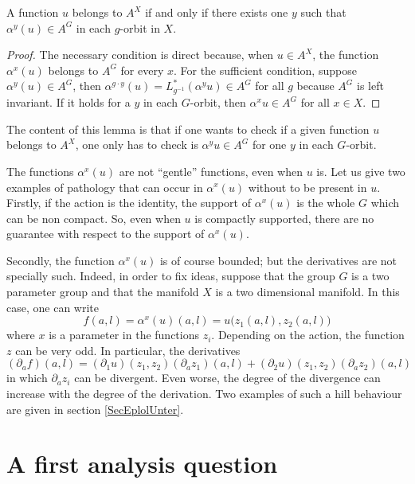 \begin{lemma}   
A function $u$ belongs to $A^{X}$ if and only if there exists one $y$ such that $\alpha^y(u)\in A^G$ in each $g$-orbit in $X$.
        \label{LemUnPtParOrbite}
\end{lemma}

\begin{proof}
The necessary condition is direct because, when $u\in A^X$, the function $\alpha^x(u)$ belongs to $A^G$ for every $x$. For the sufficient condition, suppose $\alpha^y(u)\in A^{G}$, then $\alpha^{g\cdot y}(u)=L_{g^{-1}}^*(\alpha^yu)\in A^{G}$ for all $g$ because $A^{G}$ is left invariant. If it holds for a $y$ in each $G$-orbit, then $\alpha^xu\in A^{G}$ for all $x\in X$.
\end{proof}

The content of this lemma is that if one wants to check if a given function $u$ belongs to $A^{X}$, one only has to check is $\alpha^yu\in A^{G}$ for one $y$ in each $G$-orbit.


The functions $\alpha^x(u)$ are not ``gentle'' functions, even when $u$ is. Let us give two examples of pathology that can occur in $\alpha^x(u)$ without to be present in $u$. Firstly,  if the action is the identity, the support of $\alpha^x(u)$ is the whole $G$ which can be non compact. So, even when $u$ is compactly supported, there are no guarantee with respect to the support of $\alpha^x(u)$. 

Secondly, the function $\alpha^x(u)$ is of course bounded; but the derivatives are not specially such. Indeed, in order to fix ideas, suppose that the group $G$ is a two parameter group and that the manifold $X$ is a two dimensional manifold. In this case, one can write
\begin{equation}        \label{EqDefziDefA}
  f(a,l)=\alpha^x(u)(a,l)=u\big( z_1(a,l),z_2(a,l) \big)
\end{equation}
where $x$ is a parameter in the functions $z_i$. Depending on the action, the function $z$ can be very odd. In particular, the derivatives
\[ 
  (\partial_af)(a,l)=(\partial_1u)(z_1,z_2)(\partial_az_1)(a,l)+(\partial_2u)(z_1,z_2)(\partial_az_2)(a,l)
\]
in which $\partial_az_i$ can be divergent. Even worse, the degree of the divergence can increase with the degree of the derivation. Two examples of such a hill behaviour are given in section \ref{SecEplolUnter}. 


\section{A first analysis question}

